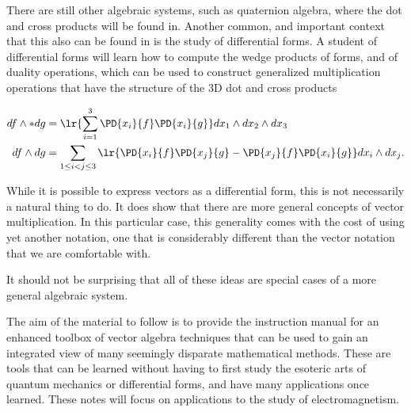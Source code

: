 There are still other algebraic systems, such as quaternion algebra, where the dot and cross products will be found in.  Another common, and important context that this also can be found in is the study of differential forms.
A student of differential forms will learn how to compute the wedge products of forms, and of duality operations, which can be used to construct generalized multiplication operations that have the structure of the 3D dot and cross products

\begin{equation}\label{eqn:GAmotivation:160}
\begin{aligned}
df \wedge * dg &= \lr{ \sum_{i=1}^3 \PD{x_i}{f} \PD{x_i}{g} } dx_1 \wedge dx_2 \wedge dx_3 \\
df \wedge dg &= \sum_{1 \le i < j \le 3} \lr{
\PD{x_i}{f} \PD{x_j}{g} 
-\PD{x_j}{f} \PD{x_i}{g} 
}
dx_i \wedge dx_j.
\end{aligned}
\end{equation}

While it is possible to express vectors as a differential form, this is not necessarily a natural thing to do.  It does show that there are more general concepts of vector multiplication.  In this particular case, this generality comes with the cost of using yet another notation, one that is considerably different than the vector notation that we are comfortable with.  

It should not be surprising that all of these ideas are special cases of a more general algebraic system.

The aim of the material to follow is to provide the instruction manual for an enhanced toolbox of vector algebra techniques that can be used to gain an integrated view of many seemingly disparate mathematical methods.  These are tools that can be learned without having to first study the esoteric arts of quantum mechanics or differential forms, and have many applications once learned.  These notes will focus on applications to the study of electromagnetism.

